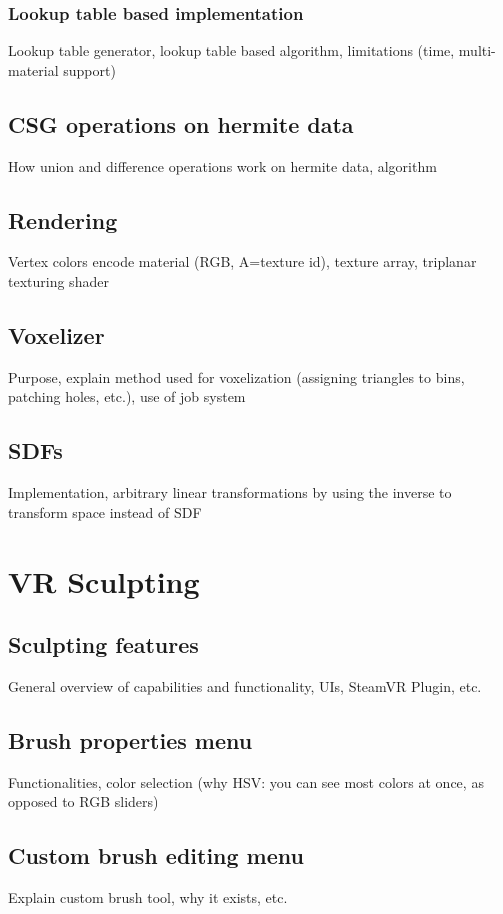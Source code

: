 \subsubsection{Lookup table based implementation}
Lookup table generator, lookup table based algorithm, limitations (time, multi-material support)

\subsection{CSG operations on hermite data}
How union and difference operations work on hermite data, algorithm

\subsection{Rendering}
Vertex colors encode material (RGB, A=texture id), texture array, triplanar texturing shader

\subsection{Voxelizer}
Purpose, explain method used for voxelization (assigning triangles to bins, patching holes, etc.), use of job system

\subsection{SDFs}
Implementation, arbitrary linear transformations by using the inverse to transform space instead of SDF

\section{VR Sculpting}

\subsection{Sculpting features}
General overview of capabilities and functionality, UIs, SteamVR Plugin, etc.

\subsection{Brush properties menu}
Functionalities, color selection (why HSV: you can see most colors at once, as opposed to RGB sliders)

\subsection{Custom brush editing menu}
Explain custom brush tool, why it exists, etc.